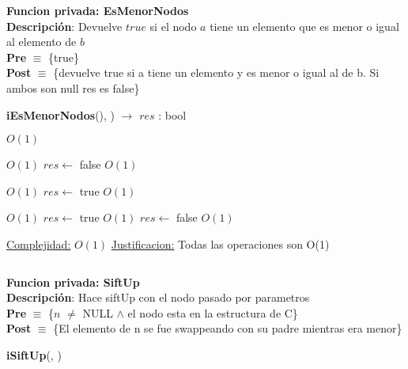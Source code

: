 \begin{Algoritmos}
\textbf{Funcion privada: EsMenorNodos}\\
\textbf{Descripci\'on}: Devuelve $true$ si el nodo $a$ tiene un elemento que es menor o igual al elemento de $b$\\
\textbf{Pre} $\equiv$ \{true\}\\%
\textbf{Post} $\equiv$ \{devuelve true si a tiene un elemento y es menor o igual al de b. Si ambos son null res es false\}%
\begin{algorithm}[H]
{\textbf{iEsMenorNodos}(), ) $\to$ $res$ : bool}
\begin{algorithmic}[1]

     \Comment $O(1)$

          \Comment $O(1)$
            \State $res \gets$ false  \Comment $O(1)$
        \Else

              \Comment $O(1)$
                \State $res \gets$ true  \Comment $O(1)$
                
            \Else

                  \Comment $O(1)$
                    \State $res \gets$ true  \Comment $O(1)$
                \EndIf
            \EndIf
        \EndIf
    \Else
        \State $res \gets$ false  \Comment $O(1)$
    \EndIf


    \medskip
    \Statex \underline{Complejidad:} $O(1)$
    \Statex \underline{Justificacion:} Todas las operaciones son O(1)

\end{algorithmic}
\end{algorithm}



$ $\newline

\textbf{Funcion privada: SiftUp}\\
\textbf{Descripci\'on}: Hace siftUp con el nodo pasado por parametros\\
\textbf{Pre} $\equiv$ \{$n$ $\neq$ NULL $\land$ el nodo esta en la estructura de C\}\\%
\textbf{Post} $\equiv$ \{El elemento de n se fue swappeando con su padre mientras era menor\}%
\begin{algorithm}[H]
{\textbf{iSiftUp}(, )}
\begin{algorithmic}[1]


\end{algorithmic}
\end{algorithm}
\end{Algoritmos}
